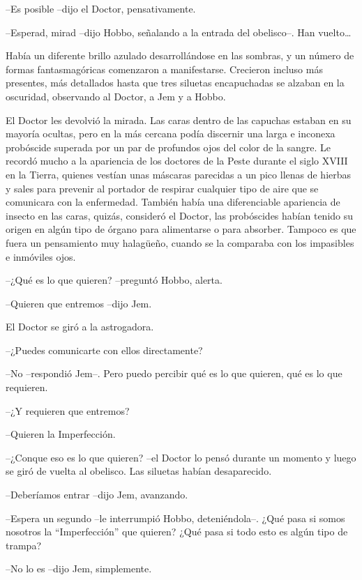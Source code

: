 {--Es posible --dijo el Doctor, pensativamente.}

{--Esperad, mirad --dijo Hobbo, señalando a la entrada del obelisco--.
 Han vuelto\ldots{}}

{Había un diferente brillo azulado desarrollándose en las sombras, y un
 número de formas fantasmagóricas comenzaron a manifestarse. Crecieron
 incluso más presentes, más detallados hasta que tres siluetas
 encapuchadas se alzaban en la oscuridad, observando al Doctor, a Jem y a
Hobbo.}

{El Doctor les devolvió la mirada. Las caras dentro de las capuchas
 estaban en su mayoría ocultas, pero en la más cercana podía discernir
 una larga e inconexa probóscide superada por un par de profundos ojos
 del color de la sangre. Le recordó mucho a la apariencia de los doctores
 de la Peste durante el siglo XVIII en la Tierra, quienes vestían unas
 máscaras parecidas a un pico llenas de hierbas y sales para prevenir al
 portador de respirar cualquier tipo de aire que se comunicara con la
 enfermedad. También había una diferenciable apariencia de insecto en las
 caras, quizás, consideró el Doctor, las probóscides habían tenido su
 origen en algún tipo de órgano para alimentarse o para absorber. Tampoco
 es que fuera un pensamiento muy halagüeño, cuando se la comparaba con
los impasibles e inmóviles ojos.}

{--¿Qué es lo que quieren? --preguntó Hobbo, alerta.}

{--Quieren que entremos --dijo Jem.}

{El Doctor se giró a la astrogadora.}

{--¿Puedes comunicarte con ellos directamente?}

{--No --respondió Jem--. Pero puedo percibir qué es lo que quieren, qué
es lo que requieren.}

{--¿Y requieren que entremos?}

{--Quieren la Imperfección.}

{--¿Conque eso es lo que quieren? --el Doctor lo pensó durante un momento
 y luego se giró de vuelta al obelisco. Las siluetas habían
desaparecido.}

{--Deberíamos entrar --dijo Jem, avanzando.}

{--Espera un segundo --le interrumpió Hobbo, deteniéndola--. ¿Qué pasa si
 somos nosotros la ``Imperfección'' que quieren? ¿Qué pasa si todo esto
es algún tipo de trampa?}

{--No lo es --dijo Jem, simplemente.}

